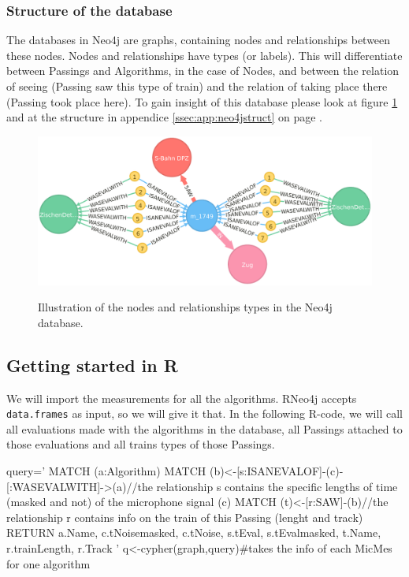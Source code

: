 \documentclass{article}\usepackage[]{graphicx}\usepackage[]{color}
\begin{document}
\subsubsection{Structure of the database}

The databases in Neo4j are graphs, containing nodes and relationships between these nodes. Nodes and relationships have types (or labels). This will differentiate between Passings and Algorithms, in the case of Nodes, and between the relation of seeing (Passing saw this type of train) and the relation of taking place there (Passing took place here). To gain insight of this database please look at figure \ref{fig:neo4jdb} and at the structure in appendice {\ref{ssec:app:neo4jstruct}} on page {\pageref{ssec:app:neo4jstruct}}.

\begin{figure}
\centering
\includegraphics[width=\textwidth]{img/graph.pdf}
\label{graphneo4j}
\caption{\label{fig:neo4jdb}Illustration of the nodes and relationships types in the Neo4j database.}
\end{figure}

\subsection{Getting started in R}

We will import the measurements for all the algorithms. RNeo4j accepts {\tt data.frames} as input, so we will give it that. In the following R-code, we will call all evaluations made with the algorithms in the database, all Passings attached to those evaluations and all trains types of those Passings.

\begin{Schunk}
\begin{Sinput}
query='
MATCH (a:Algorithm)
MATCH (b)<-[s:ISANEVALOF]-(c)-[:WASEVALWITH]->(a)//the relationship s contains the specific lengths of time (masked and not) of the microphone signal (c)
MATCH (t)<-[r:SAW]-(b)//the relationship r contains info on the train of this Passing (lenght and track)
RETURN a.Name, c.tNoisemasked, c.tNoise, s.tEval, s.tEvalmasked, t.Name, r.trainLength, r.Track
'
q<-cypher(graph,query)#takes the info of each MicMes for one algorithm
\end{Sinput}
\end{Schunk}
\end{document}
